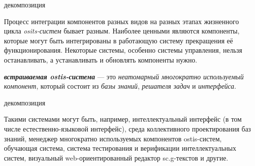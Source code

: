 \begin{SCn}
\begin{scnindent}
	\begin{scneqtoset}
		\begin{scnindent}
			\begin{scnrelfromset}{декомпозиция}
			\end{scnrelfromset}
		\end{scnindent}
	\end{scneqtoset}
\end{scnindent}
\end{SCn}

Процесс интеграции компонентов разных видов на разных этапах жизненного цикла \textit{osits-систем} бывает разным. Наиболее ценными являются компоненты, которые могут быть интегрированы в работающую систему  прекращения её функционирования. Некоторые системы, особенно системы управления, нельзя останавливать, а устанавливать и обновлять компоненты нужно.

\textbf{\textit{встраиваемая ostis-система}} --- это \textit{неатомарный многократно используемый компонент}, который состоит из \textit{базы знаний}, \textit{решателя задач} и \textit{интерфейса}.

\begin{SCn}
	\begin{scnrelfromset}{декомпозиция}
	\end{scnrelfromset}
\end{SCn}

Такими системами могут быть, например, интеллектуальный интерфейс (в том числе естественно-языковой интерфейс), среда коллективного проектирования баз знаний, менеджер многократно используемых компонентов ostis-систем, обучающая система, система тестирования и верификации интеллектуальных систем, визуальный web-ориентированный редактор sc.g-текстов и другие.

